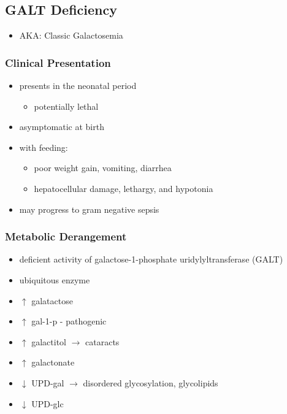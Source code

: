 \documentclass{scrartcl}
\begin{document}
\subsection{GALT Deficiency}
\label{sec:org3dc4147}
\begin{itemize}
\item AKA: Classic Galactosemia
\end{itemize}
\subsubsection{Clinical Presentation}
\label{sec:orgd8ad2bd}
\begin{itemize}
\item presents in the neonatal period
\begin{itemize}
\item potentially lethal
\end{itemize}
\item asymptomatic at birth
\item with feeding:
\begin{itemize}
\item poor weight gain, vomiting, diarrhea
\item hepatocellular damage, lethargy, and hypotonia
\end{itemize}
\item may progress to gram negative sepsis
\end{itemize}


\subsubsection{Metabolic Derangement}
\label{sec:orga0c4805}
\begin{itemize}
\item deficient activity of galactose-1-phosphate uridylyltransferase (GALT)
\item ubiquitous enzyme
\item \(\uparrow\)  galatactose
\item \(\uparrow\) gal-1-p - pathogenic
\item \(\uparrow\) galactitol \(\to\) cataracts
\item \(\uparrow\) galactonate
\item \(\downarrow\) UPD-gal \(\to\) disordered glycosylation, glycolipids
\item \(\downarrow\) UPD-glc
\end{itemize}
\end{document}
